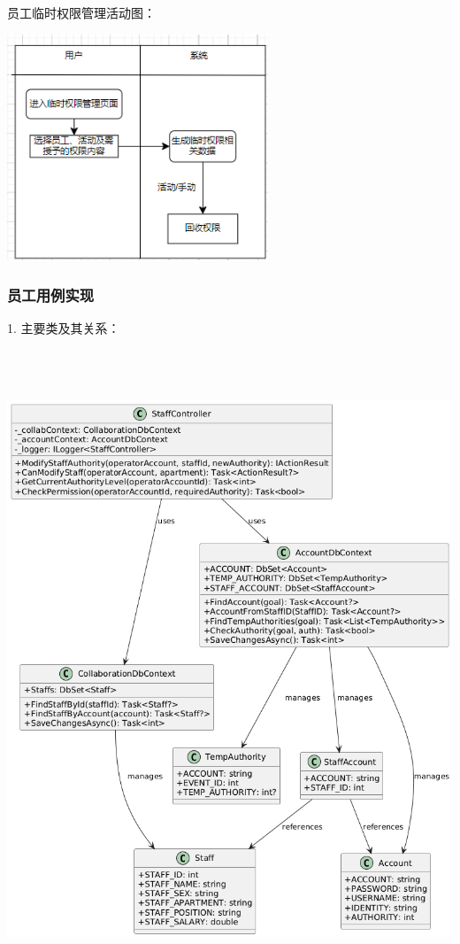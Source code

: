 \documentclass[]{article}
\begin{document}
员工临时权限管理活动图：

\includegraphics[width=3.075in,height=2.66458in]{media/media/image13.png}

\hypertarget{ux5458ux5de5ux7528ux4f8bux5b9eux73b0}{%
\subsubsection{员工用例实现}\label{ux5458ux5de5ux7528ux4f8bux5b9eux73b0}}

1. 主要类及其关系：

\includegraphics[width=6.23958in,height=7.50903in]{media/media/image14.png}
\end{document}
